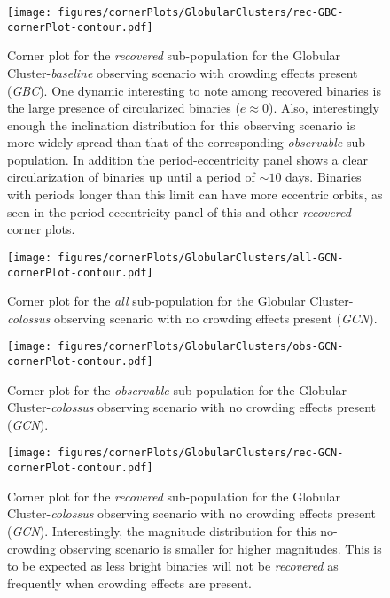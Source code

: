 \documentclass[twocolumn]{aastex63}
\begin{document}
\begin{figure}
    \centering
    \texttt{[image: figures/cornerPlots/GlobularClusters/rec-GBC-cornerPlot-contour.pdf]}
    \caption{Corner plot for the \textit{recovered} sub-population for the Globular Cluster-\textit{baseline} observing scenario with crowding effects present (\textit{GBC}). One dynamic interesting to note among recovered binaries is the large presence of circularized binaries ($e \approx 0$). Also, interestingly enough the inclination distribution for this observing scenario is more widely spread than that of the corresponding \textit{observable} sub-population. In addition the period-eccentricity panel shows a clear circularization of binaries up until a period of $\sim10$ days. Binaries with periods longer than this limit can have more eccentric orbits, as seen in the period-eccentricity panel of this and other \textit{recovered} corner plots.}
    \label{fig:gbc-rec-corner-plot-appendix}
\end{figure}\clearpage
\begin{figure}
    \centering
    \texttt{[image: figures/cornerPlots/GlobularClusters/all-GCN-cornerPlot-contour.pdf]}
    \caption{Corner plot for the \textit{all} sub-population for the Globular Cluster-\textit{colossus} observing scenario with no crowding effects present (\textit{GCN}).}
    \label{fig:gcn-All-corner-plot-appendix}
\end{figure}\clearpage

\begin{figure}
    \centering
    \texttt{[image: figures/cornerPlots/GlobularClusters/obs-GCN-cornerPlot-contour.pdf]}
    \caption{Corner plot for the \textit{observable} sub-population for the Globular Cluster-\textit{colossus} observing scenario with no crowding effects present (\textit{GCN}).}
    \label{fig:gcn-Obs-corner-plot-appendix}
\end{figure}\clearpage

\begin{figure}
    \centering
    \texttt{[image: figures/cornerPlots/GlobularClusters/rec-GCN-cornerPlot-contour.pdf]}
    \caption{Corner plot for the \textit{recovered} sub-population for the Globular Cluster-\textit{colossus} observing scenario with no crowding effects present (\textit{GCN}). Interestingly, the magnitude distribution for this no-crowding observing scenario is smaller for higher magnitudes. This is to be expected as less bright binaries will not be \textit{recovered} as frequently when crowding effects are present.}
    \label{fig:gcn-Rec-corner-plot-appendix}
\end{figure}\clearpage
\end{document}
